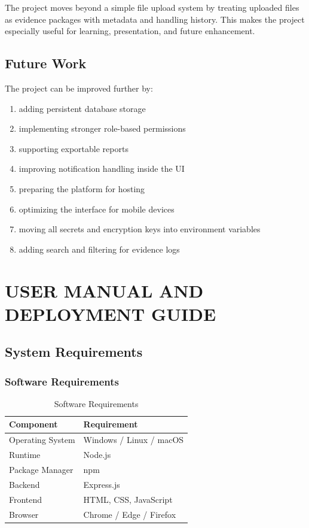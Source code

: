 \documentclass[12pt,a4paper]{report}
\begin{document}
The project moves beyond a simple file upload system by treating uploaded files as evidence packages with metadata and handling history. This makes the project especially useful for learning, presentation, and future enhancement.

\section{Future Work}
The project can be improved further by:

\begin{enumerate}
\item adding persistent database storage
\item implementing stronger role-based permissions
\item supporting exportable reports
\item improving notification handling inside the UI
\item preparing the platform for hosting
\item optimizing the interface for mobile devices
\item moving all secrets and encryption keys into environment variables
\item adding search and filtering for evidence logs
\end{enumerate}

\chapter{USER MANUAL AND DEPLOYMENT GUIDE}

\section{System Requirements}
\subsection{Software Requirements}

\begin{table}[h!]
\centering
\begin{tabular}{ll}
\toprule
\textbf{Component} & \textbf{Requirement} \\
\midrule
Operating System & Windows / Linux / macOS \\
Runtime & Node.js \\
Package Manager & npm \\
Backend & Express.js \\
Frontend & HTML, CSS, JavaScript \\
Browser & Chrome / Edge / Firefox \\
\bottomrule
\end{tabular}
\caption{Software Requirements}
\end{table}
\end{document}
